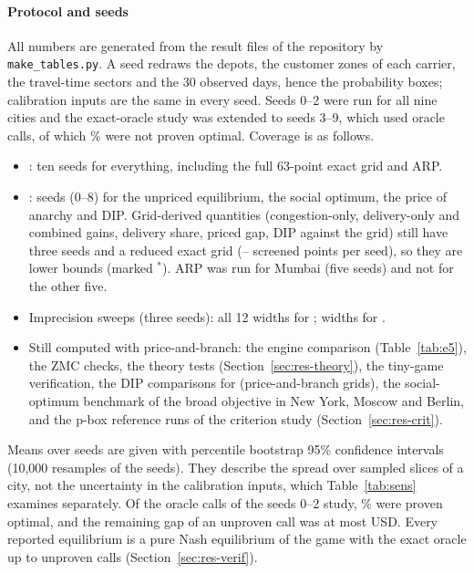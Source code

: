 \documentclass[preprint,11pt]{elsarticle}
\theoremstyle{definition}
\theoremstyle{remark}
\begin{document}
\paragraph{Protocol and seeds} All numbers are generated from the result files of the repository by \texttt{make\_tables.py}. A seed redraws the depots, the customer zones of each carrier, the travel-time sectors and the 30 observed days, hence the probability boxes; calibration inputs are the same in every seed. Seeds 0--2 were run for all nine cities and the exact-oracle study was extended to seeds 3--9, which used \TenOracleCalls{} oracle calls, of which \TenUnprovenPct\% were not proven optimal. Coverage is as follows.
\begin{itemize}[leftmargin=*,itemsep=0pt]
\item \TenFullCities{}: ten seeds for everything, including the full 63-point exact grid and ARP.
\item \TenRedCities: \TenRedSeedsMax{} seeds (0--8) for the unpriced equilibrium, the social optimum, the price of anarchy and DIP. Grid-derived quantities (congestion-only, delivery-only and combined gains, delivery share, priced gap, DIP against the grid) still have three seeds and a reduced exact grid (\ExEtwoRedMin--\ExEtwoRedMax{} screened points per seed), so they are lower bounds (marked $^*$). ARP was run for Mumbai (five seeds) and not for the other five.
\item Imprecision sweeps (three seeds): all 12 widths for \ExEfourFullCities; \ExEfourRedWidths{} widths for \ExEfourRedCities.
\item Still computed with price-and-branch: the engine comparison (Table~\ref{tab:e5}), the ZMC checks, the theory tests (Section~\ref{sec:res-theory}), the tiny-game verification, the DIP comparisons for \DipPbCases{} (price-and-branch grids), the social-optimum benchmark of the broad objective in New York, Moscow and Berlin, and the p-box reference runs of the criterion study (Section~\ref{sec:res-crit}).
\end{itemize}
Means over seeds are given with percentile bootstrap 95\% confidence intervals (10{,}000 resamples of the seeds). They describe the spread over sampled slices of a city, not the uncertainty in the calibration inputs, which Table~\ref{tab:sens} examines separately. Of the \ExCalls{} oracle calls of the seeds 0--2 study, \ExProvenPct\% were proven optimal, and the remaining gap of an unproven call was at most \ExMaxGap{} USD. Every reported equilibrium is a pure Nash equilibrium of the game with the exact oracle up to unproven calls (Section~\ref{sec:res-verif}).
\end{document}
